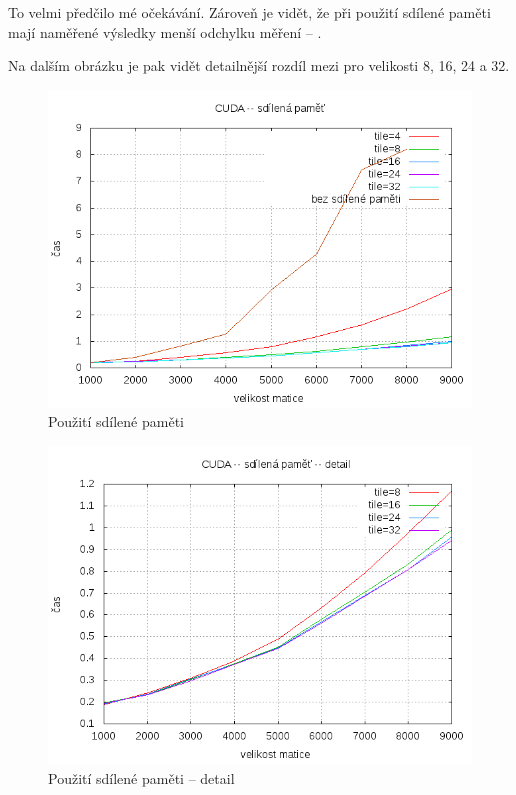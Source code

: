 \documentclass[12pt,a4paper]{article}
\begin{document}
\medskip
To velmi předčilo mé očekávání. Zároveň je vidět, že při použití sdílené paměti mají naměřené výsledky menší odchylku měření -- .

\medskip
Na dalším obrázku je pak vidět detailnější rozdíl mezi  pro velikosti 8, 16, 24 a 32.

\begin{figure}[h]
\includegraphics[width=\textwidth]{graph/cuda2/shared/cuda-shared.png}
\caption{Použití sdílené paměti}
\label{cuda-shared}
\end{figure}

\pagebreak
\begin{figure}[h]
\includegraphics[width=\textwidth]{graph/cuda2/shared/cuda-shared-2.png}
\caption{Použití sdílené paměti -- detail}
\label{cuda-shared-detail}
\end{figure}
\end{document}
